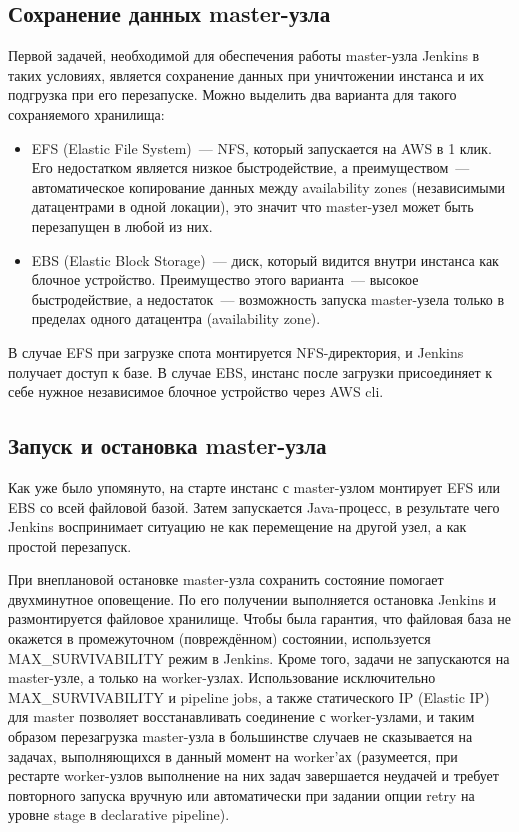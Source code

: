 \documentclass[10pt, a5paper]{article}
\begin{document}
\subsection*{Сохранение данных master-узла}

Первой задачей, необходимой для обеспечения работы master-узла Jenkins в таких условиях, является сохранение данных при уничтожении инстанса и их подгрузка при его перезапуске. Можно выделить два варианта для такого сохраняемого хранилища:

\begin{itemize}
  \item EFS (Elastic File System)~--- NFS, который запускается на AWS в 1 клик. Его недостатком является низкое быстродействие, а преимуществом~--- автоматическое копирование данных между availability zones (независимыми датацентрами в одной локации), это значит что master-узел может быть перезапущен в любой из них.
  \item EBS (Elastic Block Storage)~--- диск, который видится внутри инстанса как блочное устройство. Преимущество этого варианта~--- высокое быстродействие, а недостаток~--- возможность запуска master-узела только в пределах одного датацентра (availability zone).
\end{itemize}

В случае EFS при загрузке спота монтируется NFS-директория, и Jenkins получает доступ к базе. В случае EBS, инстанс после загрузки присоединяет к себе нужное независимое блочное устройство через AWS cli.

\subsection*{Запуск и остановка master-узла}

Как уже было упомянуто, на старте инстанс с master-узлом монтирует EFS или EBS со всей файловой базой. Затем запускается Java-процесс, в результате чего Jenkins воспринимает ситуацию не как перемещение на другой узел, а как простой перезапуск.

При внеплановой остановке master-узла сохранить состояние помогает двухминутное оповещение. По его получении выполняется остановка Jenkins и размонтируется файловое хранилище. Чтобы была гарантия, что файловая база не окажется в промежуточном (повреждённом) состоянии, используется MAX\_SURVIVABILITY режим в Jenkins. Кроме того, задачи не запускаются на master-узле, а только на worker-узлах. Использование исключительно MAX\_SURVIVABILITY и pipeline jobs, а также статического IP (Elastic IP) для master позволяет восстанавливать соединение с worker-\linebreak узлами, и таким образом перезагрузка master-узла в большинстве случаев не сказывается на задачах, выполняющихся в данный момент на worker'ах (разумеется, при рестарте worker-узлов выполнение на них задач завершается неудачей и требует повторного запуска вручную или автоматически при задании опции retry на уровне stage в declarative pipeline).
\end{document}
